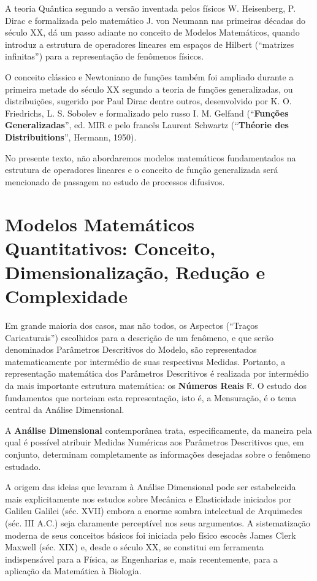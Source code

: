     A teoria Quântica segundo a versão inventada pelos físicos W. Heisenberg, P. Dirac e formalizada pelo matemático J. von Neumann nas primeiras décadas do século XX, dá um passo adiante no conceito de Modelos Matemáticos, quando introduz a estrutura de operadores lineares em espaços de Hilbert (``matrizes infinitas'') para a representação de fenômenos físicos.

    O conceito clássico e Newtoniano de funções também foi ampliado durante a primeira metade do século XX segundo a teoria de funções generalizadas, ou distribuições, sugerido por Paul Dirac dentre outros, desenvolvido por K. O. Friedrichs, L. S. Sobolev e formalizado pelo russo I. M. Gelfand (``\textbf{Funções Generalizadas}'', ed. MIR e pelo francês Laurent Schwartz (``\textbf{Théorie des Distribuitions}'', Hermann, 1950).

    No presente texto, não abordaremos modelos matemáticos fundamentados na estrutura de operadores lineares e o conceito de função generalizada será mencionado de passagem no estudo de processos difusivos.

\section{Modelos Matemáticos Quantitativos: Conceito, Dimensionalização, Redução e Complexidade}

    Em grande maioria dos casos, mas não todos, os Aspectos (``Traços Caricaturais'') escolhidos para a descrição de um fenômeno, e que serão denominados Parâmetros Descritivos do Modelo, são representados matematicamente por intermédio de suas respectivas Medidas. Portanto, a representação matemática dos Parâmetros Descritivos é realizada por intermédio da mais importante estrutura matemática: os \textbf{Números Reais} \(\mathbb{R}\). O estudo dos fundamentos que norteiam esta representação, isto é, a Mensuração, é o tema central da Análise Dimensional.

    A \textbf{Análise Dimensional} contemporânea trata, especificamente, da maneira pela qual é possível atribuir Medidas Numéricas aos Parâmetros Descritivos que, em conjunto, determinam completamente as informações desejadas sobre o fenômeno estudado.

    A origem das ideias que levaram à Análise Dimensional pode ser estabelecida mais explicitamente nos estudos sobre Mecânica e Elasticidade iniciados por Galileu Galilei (séc. XVII) embora a enorme sombra intelectual de Arquimedes (séc. III A.C.) seja claramente perceptível nos seus argumentos. A sistematização moderna de seus conceitos básicos foi iniciada pelo físico escocês James Clerk Maxwell (séc. XIX) e, desde o século XX, se constitui em ferramenta indispensável para a Física, as Engenharias e, mais recentemente, para a aplicação da Matemática à Biologia.
    
